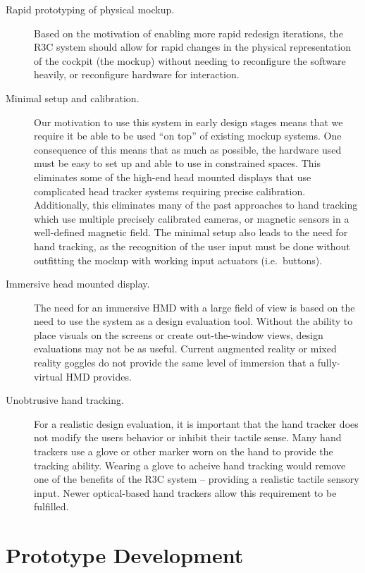 \begin{description}
    \item [Rapid prototyping of physical mockup.]
        Based on the motivation of enabling more rapid redesign iterations, the R3C system should allow for rapid changes in the physical representation of the cockpit (the mockup) without needing to reconfigure the software heavily, or reconfigure hardware for interaction.
    \item [Minimal setup and calibration.]
        Our motivation to use this system in early design stages means that we require it be able to be used ``on top'' of existing mockup systems.
        One consequence of this means that as much as possible, the hardware used must be easy to set up and able to use in constrained spaces.
        This eliminates some of the high-end head mounted displays that use complicated head tracker systems requiring precise calibration.
        Additionally, this eliminates many of the past approaches to hand tracking which use multiple precisely calibrated cameras, or magnetic sensors in a well-defined magnetic field.
        The minimal setup also leads to the need for hand tracking, as the recognition of the user input must be done without outfitting the mockup with working input actuators (i.e.\ buttons).
    \item [Immersive head mounted display.]
        The need for an immersive HMD with a large field of view is based on the need to use the system as a design evaluation tool.
        Without the ability to place visuals on the screens or create out-the-window views, design evaluations may not be as useful.
        Current augmented reality or mixed reality goggles do not provide the same level of immersion that a fully-virtual HMD provides.
    \item [Unobtrusive hand tracking.]
        For a realistic design evaluation, it is important that the hand tracker does not modify the users behavior or inhibit their tactile sense.
        Many hand trackers use a glove or other marker worn on the hand to provide the tracking ability.
        Wearing a glove to acheive hand tracking would remove one of the benefits of the R3C system -- providing a realistic tactile sensory input.
        Newer optical-based hand trackers allow this requirement to be fulfilled.
\end{description}

\section{Prototype Development}

